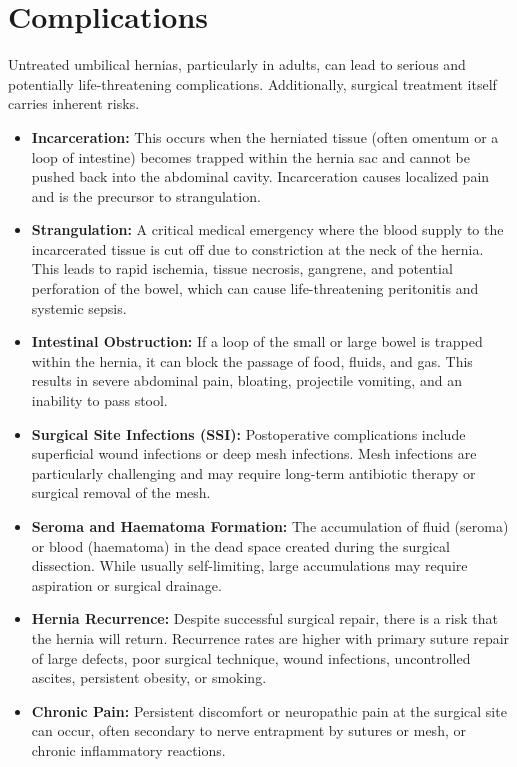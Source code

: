 \section*{Complications}
Untreated umbilical hernias, particularly in adults, can lead to serious and potentially life-threatening complications. Additionally, surgical treatment itself carries inherent risks.
\begin{itemize}
    \item \textbf{Incarceration:} This occurs when the herniated tissue (often omentum or a loop of intestine) becomes trapped within the hernia sac and cannot be pushed back into the abdominal cavity. Incarceration causes localized pain and is the precursor to strangulation.
    \item \textbf{Strangulation:} A critical medical emergency where the blood supply to the incarcerated tissue is cut off due to constriction at the neck of the hernia. This leads to rapid ischemia, tissue necrosis, gangrene, and potential perforation of the bowel, which can cause life-threatening peritonitis and systemic sepsis.
    \item \textbf{Intestinal Obstruction:} If a loop of the small or large bowel is trapped within the hernia, it can block the passage of food, fluids, and gas. This results in severe abdominal pain, bloating, projectile vomiting, and an inability to pass stool.
    \item \textbf{Surgical Site Infections (SSI):} Postoperative complications include superficial wound infections or deep mesh infections. Mesh infections are particularly challenging and may require long-term antibiotic therapy or surgical removal of the mesh.
    \item \textbf{Seroma and Haematoma Formation:} The accumulation of fluid (seroma) or blood (haematoma) in the dead space created during the surgical dissection. While usually self-limiting, large accumulations may require aspiration or surgical drainage.
    \item \textbf{Hernia Recurrence:} Despite successful surgical repair, there is a risk that the hernia will return. Recurrence rates are higher with primary suture repair of large defects, poor surgical technique, wound infections, uncontrolled ascites, persistent obesity, or smoking.
    \item \textbf{Chronic Pain:} Persistent discomfort or neuropathic pain at the surgical site can occur, often secondary to nerve entrapment by sutures or mesh, or chronic inflammatory reactions.
\end{itemize}

